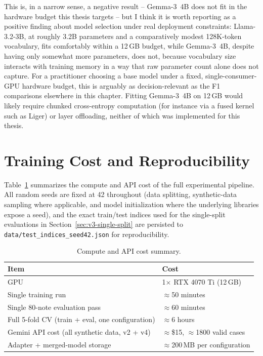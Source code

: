 \documentclass[12pt,a4paper]{report}
\begin{document}
This is, in a narrow sense, a negative result -- Gemma-3~4B does not fit in the hardware budget this thesis targets -- but I think it is worth reporting as a positive finding about model selection under real deployment constraints: Llama-3.2-3B, at roughly 3.2B parameters and a comparatively modest 128K-token vocabulary, fits comfortably within a 12\,GB budget, while Gemma-3~4B, despite having only somewhat more parameters, does not, because vocabulary size interacts with training memory in a way that raw parameter count alone does not capture. For a practitioner choosing a base model under a fixed, single-consumer-GPU hardware budget, this is arguably as decision-relevant as the F1 comparisons elsewhere in this chapter. Fitting Gemma-3~4B on 12\,GB would likely require chunked cross-entropy computation (for instance via a fused kernel such as Liger) or layer offloading, neither of which was implemented for this thesis.

\section{Training Cost and Reproducibility}

Table~\ref{tab:cost-summary} summarizes the compute and API cost of the full experimental pipeline. All random seeds are fixed at 42 throughout (data splitting, synthetic-data sampling where applicable, and model initialization where the underlying libraries expose a seed), and the exact train/test indices used for the single-split evaluations in Section~\ref{sec:v3-single-split} are persisted to \texttt{data/test\_indices\_seed42.json} for reproducibility.

\begin{table}[htbp]
\centering
\caption{Compute and API cost summary.}
\label{tab:cost-summary}
\begin{tabular}{ll}
\toprule
Item & Cost \\
\midrule
GPU & 1$\times$ RTX 4070 Ti (12\,GB) \\
Single training run & $\approx$50 minutes \\
Single 80-note evaluation pass & $\approx$60 minutes \\
Full 5-fold CV (train + eval, one configuration) & $\approx$6 hours \\
Gemini API cost (all synthetic data, v2 + v4) & $\approx$\$15, $\approx$1800 valid cases \\
Adapter + merged-model storage & $\approx$200\,MB per configuration \\
\bottomrule
\end{tabular}
\end{table}
\end{document}
